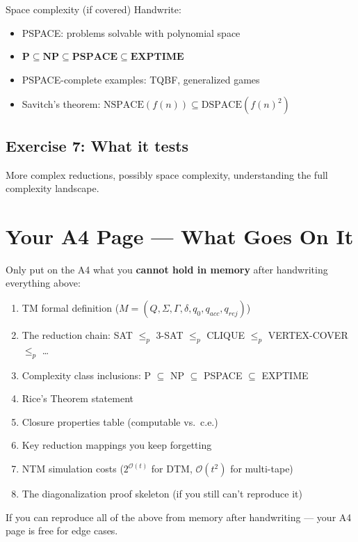 \documentclass[11pt,a4paper]{article}
\begin{document}
\begin{writebox}{Space complexity (if covered)}
Handwrite:
\begin{itemize}[nosep]
\item PSPACE: problems solvable with polynomial space
\item $\textbf{P} \subseteq \textbf{NP} \subseteq \textbf{PSPACE} \subseteq \textbf{EXPTIME}$
\item PSPACE-complete examples: TQBF, generalized games
\item Savitch's theorem: $\text{NSPACE}(f(n)) \subseteq \text{DSPACE}(f(n)^2)$
\end{itemize}
\end{writebox}

\subsection*{Exercise 7: What it tests}
More complex reductions, possibly space complexity, understanding the full complexity landscape.

\vspace{1em}
\section*{Your A4 Page --- What Goes On It}

\begin{tcolorbox}[colback=lightred, colframe=warnred, fonttitle=\bfseries, title={After handwriting all 7 lectures, these are A4 candidates}]
Only put on the A4 what you \textbf{cannot hold in memory} after handwriting everything above:
\begin{enumerate}[nosep]
\item TM formal definition ($M = (Q, \Sigma, \Gamma, \delta, q_0, q_{acc}, q_{rej})$)
\item The reduction chain: SAT $\leq_p$ 3-SAT $\leq_p$ CLIQUE $\leq_p$ VERTEX-COVER $\leq_p$ \ldots
\item Complexity class inclusions: P $\subseteq$ NP $\subseteq$ PSPACE $\subseteq$ EXPTIME
\item Rice's Theorem statement
\item Closure properties table (computable vs.\ c.e.)
\item Key reduction mappings you keep forgetting
\item NTM simulation costs ($2^{\mathcal{O}(t)}$ for DTM, $\mathcal{O}(t^2)$ for multi-tape)
\item The diagonalization proof skeleton (if you still can't reproduce it)
\end{enumerate}
If you can reproduce all of the above from memory after handwriting --- your A4 page is free for edge cases.
\end{tcolorbox}
\end{document}
